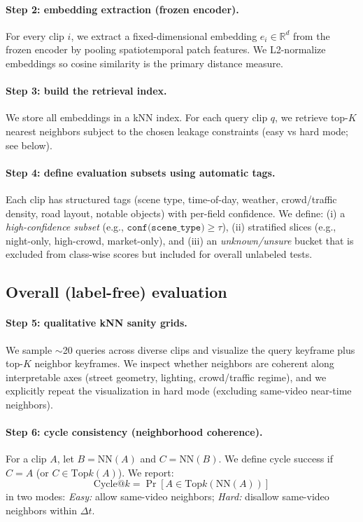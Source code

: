 \paragraph{Step 2: embedding extraction (frozen encoder).}
For every clip $i$, we extract a fixed-dimensional embedding $e_i \in \mathbb{R}^d$ from the frozen encoder by pooling spatiotemporal patch features. We L2-normalize embeddings so cosine similarity is the primary distance measure.

\paragraph{Step 3: build the retrieval index.}
We store all embeddings in a kNN index. For each query clip $q$, we retrieve top-$K$ nearest neighbors subject to the chosen leakage constraints (easy vs hard mode; see below).

\paragraph{Step 4: define evaluation subsets using automatic tags.}
Each clip has structured tags (scene type, time-of-day, weather, crowd/traffic density, road layout, notable objects) with per-field confidence. We define:
(i) a \emph{high-confidence subset} (e.g., $\texttt{conf(scene\_type)} \ge \tau$),
(ii) stratified slices (e.g., night-only, high-crowd, market-only), and
(iii) an \emph{unknown/unsure} bucket that is excluded from class-wise scores but included for overall unlabeled tests.

\subsection{Overall (label-free) evaluation}\label{sec:vjepa_eval_overall}

\paragraph{Step 5: qualitative kNN sanity grids.}
We sample $\sim$20 queries across diverse clips and visualize the query keyframe plus top-$K$ neighbor keyframes. We inspect whether neighbors are coherent along interpretable axes (street geometry, lighting, crowd/traffic regime), and we explicitly repeat the visualization in hard mode (excluding same-video near-time neighbors).

\paragraph{Step 6: cycle consistency (neighborhood coherence).}
For a clip $A$, let $B=\text{NN}(A)$ and $C=\text{NN}(B)$. We define cycle success if $C=A$ (or $C \in \text{Top}k(A)$). We report:
\[
\text{Cycle@}k = \Pr\left[A \in \text{Top}k(\text{NN}(A))\right]
\]
in two modes:
\emph{Easy:} allow same-video neighbors; \emph{Hard:} disallow same-video neighbors within $\Delta t$.

